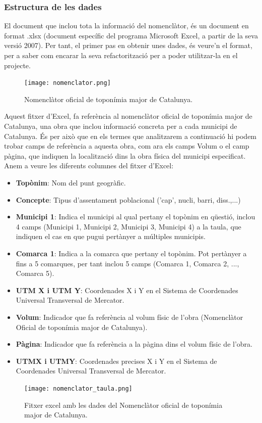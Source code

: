 \documentclass[12pt,a4paper,openright,oneside]{article}
\numberwithin{equation}{section}
\theoremstyle{definition}
\begin{document}
\subsubsection*{Estructura de les dades}
El document que inclou tota la informació del nomenclàtor, és un document en format .xlsx (document específic del programa Microsoft Excel, a partir de la seva versió 2007). Per tant, el primer pas en obtenir unes dades, és veure'n el format, per a saber com encarar la seva refactorització per a poder utilitzar-la en el projecte.
\newpage
\begin{figure}[htbp]
\centering
\texttt{[image: nomenclator.png]}
\caption{Nomenclàtor oficial de toponímia major de Catalunya.}
\end{figure}
Aquest fitxer d'Excel, fa referència al nomenclàtor oficial de toponímia major de Catalunya, una obra que inclou informació concreta per a cada municipi de Catalunya. És per això que en els termes que analitzarem a continuació hi podem trobar camps de referència a aquesta obra, com ara els camps Volum o el camp pàgina, que indiquen la localització dins la obra física del municipi especificat.\\
Anem a veure les diferents columnes del fitxer d'Excel:
\begin{itemize}
\item \textbf{Topònim}: Nom del punt geogràfic.
\item \textbf{Concepte}: Tipus d'assentament poblacional ('cap', nucli, barri, diss.,...)
\item \textbf{Municipi 1}: Indica el municipi al qual pertany el topònim en qüestió, inclou 4 camps (Municipi 1, Municipi 2, Municipi 3, Municipi 4) a la taula, que indiquen el cas en que pugui pertànyer a múltiples municipis.
\item \textbf{Comarca 1}: Indica a la comarca que pertany el topònim. Pot pertànyer a fins a 5 comarques, per tant inclou 5 camps (Comarca 1, Comarca 2, ..., Comarca 5).
\item \textbf{UTM X i UTM Y}: Coordenades X i Y en el Sistema de Coordenades Universal Transversal de Mercator.
\item \textbf{Volum}: Indicador que fa referència al volum físic de l'obra (Nomenclàtor Oficial de toponímia major de Catalunya).
\item \textbf{Pàgina}: Indicador que fa referència a la pàgina dins el volum físic de l'obra.
\item \textbf{UTMX i UTMY}: Coordenades precises X i Y en el Sistema de Coordenades Universal Transversal de Mercator.
\end{itemize}
\begin{figure}[htbp]
\centering
\texttt{[image: nomenclator\_taula.png]}
\caption{Fitxer excel amb les dades del Nomenclàtor oficial de toponímia major de Catalunya.}
\end{figure}
\end{document}
